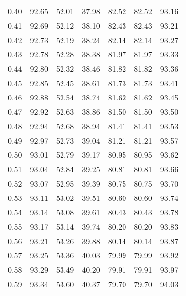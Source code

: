 \begin{tabular}{|c|c|c|c|c|c|c|}
      0.40 &     92.65 &     52.01 &      37.98 &   82.52 &      82.52 &         93.16 \\
      0.41 &     92.69 &     52.12 &      38.10 &   82.43 &      82.43 &         93.21 \\
      0.42 &     92.73 &     52.19 &      38.24 &   82.14 &      82.14 &         93.27 \\
      0.43 &     92.78 &     52.28 &      38.38 &   81.97 &      81.97 &         93.33 \\
      0.44 &     92.80 &     52.32 &      38.46 &   81.82 &      81.82 &         93.36 \\
      0.45 &     92.85 &     52.45 &      38.61 &   81.73 &      81.73 &         93.41 \\
      0.46 &     92.88 &     52.54 &      38.74 &   81.62 &      81.62 &         93.45 \\
      0.47 &     92.92 &     52.63 &      38.86 &   81.50 &      81.50 &         93.50 \\
      0.48 &     92.94 &     52.68 &      38.94 &   81.41 &      81.41 &         93.53 \\
      0.49 &     92.97 &     52.73 &      39.04 &   81.21 &      81.21 &         93.57 \\
      0.50 &     93.01 &     52.79 &      39.17 &   80.95 &      80.95 &         93.62 \\
      0.51 &     93.04 &     52.84 &      39.25 &   80.81 &      80.81 &         93.66 \\
      0.52 &     93.07 &     52.95 &      39.39 &   80.75 &      80.75 &         93.70 \\
      0.53 &     93.11 &     53.02 &      39.51 &   80.60 &      80.60 &         93.74 \\
      0.54 &     93.14 &     53.08 &      39.61 &   80.43 &      80.43 &         93.78 \\
      0.55 &     93.17 &     53.14 &      39.74 &   80.20 &      80.20 &         93.83 \\
      0.56 &     93.21 &     53.26 &      39.88 &   80.14 &      80.14 &         93.87 \\
      0.57 &     93.25 &     53.36 &      40.03 &   79.99 &      79.99 &         93.92 \\
      0.58 &     93.29 &     53.49 &      40.20 &   79.91 &      79.91 &         93.97 \\
      0.59 &     93.34 &     53.60 &      40.37 &   79.70 &      79.70 &         94.03 \\

\end{tabular}
